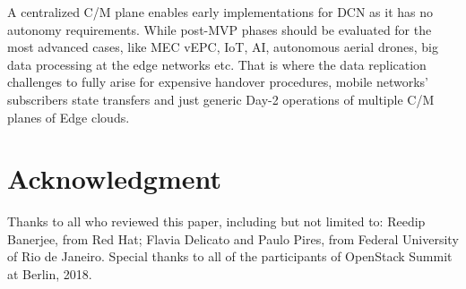 \documentclass[conference]{IEEEtran}
\begin{document}
A centralized C/M plane enables early implementations for DCN as it has no
autonomy requirements. While post-MVP phases should be evaluated for the most
advanced cases, like MEC vEPC, IoT, AI, autonomous aerial drones, big data
processing at the edge networks etc. That is where the data replication
challenges to fully arise for expensive handover procedures, mobile networks'
subscribers state transfers and just generic Day-2 operations of multiple
C/M planes of Edge clouds.

\section*{Acknowledgment}
Thanks to all who reviewed this paper, including but not limited to:
Reedip Banerjee, from Red Hat; Flavia Delicato and Paulo Pires, from Federal
University of Rio de Janeiro. Special thanks to all of the participants of
OpenStack Summit at Berlin, 2018.
\end{document}
